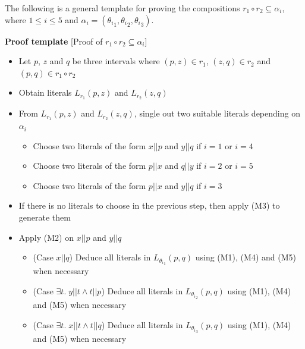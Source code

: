 \documentclass{llncs}
\begin{document}
The following is a general template for proving the compositions $r_1 \circ r_2 \subseteq \alpha_i$, where $1\leq i \leq 5$ and $\alpha_i = ({\theta_i}_1, {\theta_i}_2, {\theta_i}_3)$. %

\begin{flushleft}
\textbf{Proof template}  [Proof of $r_1 \circ  r_2 \subseteq \alpha_i$]
\end{flushleft}
\begin{itemize}
\item[1.] Let $p$, $z$ and $q$ be three intervals where $(p,z) \in r_1$, $(z,q) \in r_2$ and $(p,q) \in r_1 \circ r_2$ 
\item[2.] Obtain literals  $L_{r_1}(p,z)$ and $L_{r_2}(z,q)$
\item[3.] From $L_{r_1}(p,z)$ and $L_{r_2}(z,q)$, single out two suitable literals depending on $\alpha_i$
\begin{itemize}
\item[(a)] Choose two literals of the form $x||p$ and $y||q$ if $i = 1$ or $i=4$
\item[(b)] Choose two literals of the form $p||x$ and $q||y$ if $i= 2$ or $i=5$
\item[(c)] Choose two literals of the form $p||x$ and $y||q$ if $i = 3$
\end{itemize}
\item[4.] If there is no literals to choose in the previous step, then apply (M3) to generate them

\item[5.] Apply (M2) on $x||p$ and $y||q$ %
\begin{itemize}
\item[] (Case $x||q$) Deduce all literals in $L_{{\theta_i}_1}(p,q)$ using (M1), (M4) and (M5) when necessary%
\item[] (Case $\exists t.\;y||t\land t||p$)
Deduce all literals in $L_{{\theta_i}_2}(p,q)$ using (M1), (M4) and (M5) when necessary  %
\item[] (Case $\exists t.\;x||t\land t||q$)
Deduce all literals in $L_{{\theta_i}_3}(p,q)$ using (M1), (M4) and (M5) when necessary %
\end{itemize}
\end{itemize}
\end{document}
